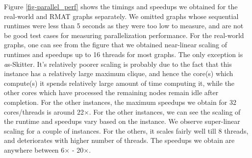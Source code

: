 Figure \ref{fig-parallel_perf} shows the timings and speedups we obtained for the real-world and RMAT graphs separately. We omitted graphs whose sequential runtimes were less than 5 seconds as they were too low to measure, and are not be good test cases for measuring parallelization performance. For the real-world graphs, one can see from the figure that we obtained near-linear scaling of runtimes and speedups up to 16 threads for most graphs. The only exception is {\emph as-Skitter}. It's relatively poorer scaling is probably due to the fact that this instance has a relatively large maximum clique, and hence the core(s) which compute(s) it spends relatively large amount of time computing it, while the other cores which have processed the remaining nodes remain idle after completion. For the other instances, the maximum speedups we obtain for 32 cores/threads is around 22$\times$. 
For the other instances, we can see the scaling of the runtime and speedups vary based on the instance. We observe super-linear scaling for a couple of instances. For the others, it scales fairly well till 8 threads, and deteriorates with higher number of threads. The speedups we obtain are anywhere between 6$\times$ - 20$\times$.









